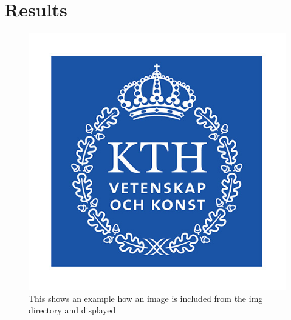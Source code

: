 \chapter{Results}



\begin{figure}[ht]
\centering
\includegraphics[scale=1]{img/kth-logo}
\caption{This shows an example how an image is included from the img directory and displayed}
\end{figure}

\blindtext